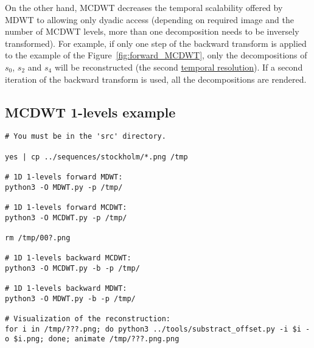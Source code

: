 On the other hand, MCDWT decreases the temporal scalability offered by
MDWT to allowing only dyadic access (depending on required image and
the number of MCDWT levels, more than one decomposition needs to be
inversely transformed). For example, if only one step of the backward
transform is applied to the example of the
Figure~\ref{fig:forward_MCDWT}, only the decompositions of $s_0$,
$s_2$ and $s_4$ will be reconstructed (the second
\href{https://en.wikipedia.org/wiki/Temporal_resolution}{temporal
  resolution}). If a second iteration of the backward transform is
used, all the decompositions are rendered.

\subsection{MCDWT 1-levels example}
\begin{verbatim}
# You must be in the 'src' directory.

yes | cp ../sequences/stockholm/*.png /tmp

# 1D 1-levels forward MDWT:
python3 -O MDWT.py -p /tmp/

# 1D 1-levels forward MCDWT:
python3 -O MCDWT.py -p /tmp/

rm /tmp/00?.png

# 1D 1-levels backward MCDWT:
python3 -O MCDWT.py -b -p /tmp/

# 1D 1-levels backward MDWT:
python3 -O MDWT.py -b -p /tmp/

# Visualization of the reconstruction:
for i in /tmp/???.png; do python3 ../tools/substract_offset.py -i $i -o $i.png; done; animate /tmp/???.png.png
\end{verbatim}

